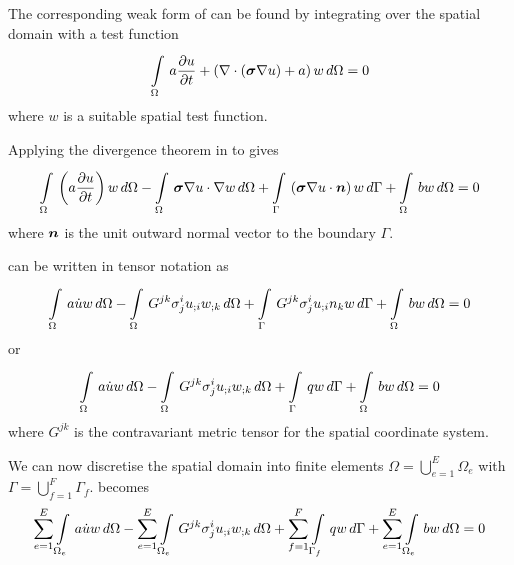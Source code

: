 
The corresponding weak form of  can be found by
integrating over the spatial domain with a test function \ie
\begin{equation}
    \displaystyle\int\limits_{\Omega}^{} \,a \dfrac{\partial u}{\partial t} +\left(  \nabla\cdot\left( \boldsymbol{\sigma}
          \nabla u \right) +a \right)w\,d\Omega =0
  \label{eqn:diffusionweakform1}
\end{equation}
where $w$ is a suitable spatial test function.

Applying the divergence theorem in 
to  gives
\begin{equation}
  \gint{\Omega}{}{\pbrac{a\delby{u}{t}}w}{\Omega}-
      \gint{\Omega}{}{\dotprod{\tensor{\sigma}\gradient{u}}{\gradient{w}}}{\Omega}
      +\gint{\Gamma}{}{\pbrac{\dotprod{\tensor{\sigma}\gradient{u}}{\normal}}w}{\Gamma}+
      \gint{\Omega}{}{bw}{\Omega}=0
  \label{eqn:diffusionweakform2}
\end{equation}
where $\normal$ is the unit outward normal vector to the boundary $\Gamma$.


 can be written in tensor notation as
\begin{equation}
    \displaystyle\int\limits_{\Omega}^{} \,a\dot{u}w\,d\Omega -
    \displaystyle\int\limits_{\Omega}^{} \,G^{jk}\sigma^{i}_{j} {u}_{;i}  {w}_{;k} \,d\Omega +
    \displaystyle\int\limits_{\Gamma}^{} \,G^{jk}\sigma^{i}_{j} {u}_{;i} n_{k}w\,d\Gamma  +
    \displaystyle\int\limits_{\Omega}^{} \,bw\,d\Omega =0
  \label{eqn:diffusiontensorform1}
\end{equation}
or
\begin{equation}
    \displaystyle\int\limits_{\Omega}^{} \,a\dot{u}w\,d\Omega -
    \displaystyle\int\limits_{\Omega}^{} \,G^{jk}\sigma^{i}_{j} {u}_{;i}  {w}_{;k} \,d\Omega +
    \displaystyle\int\limits_{\Gamma}^{} \,qw\,d\Gamma  +
    \displaystyle\int\limits_{\Omega}^{} \,bw\,d\Omega =0
  \label{eqn:diffusiontensorform2}
\end{equation}
where $G^{jk}$ is the contravariant metric tensor for the spatial coordinate system.


We can now discretise the spatial domain into finite elements \ie $\Omega=
\displaystyle{\bigcup_{e=1}^{E}}\Omega_{e}$ with
$\Gamma=\displaystyle{\bigcup_{f=1}^{F}}\Gamma_{f}$. 
 becomes
\begin{equation}
  \displaystyle\sum_{e=1}^{E}  \displaystyle\int\limits_{\Omega_{e}}^{} \,a\dot{u}w\,d\Omega -
  \displaystyle\sum_{e=1}^{E}  \displaystyle\int\limits_{\Omega_{e}}^{} \,G^{jk}\sigma^{i}_{j}
     {u}_{;i}  {w}_{;k} \,d\Omega +
  \displaystyle\sum_{f=1}^{F}  \displaystyle\int\limits_{\Gamma_{f}}^{} \,qw\,d\Gamma  +
  \displaystyle\sum_{e=1}^{E}  \displaystyle\int\limits_{\Omega_{e}}^{} \,bw\,d\Omega =0
  \label{eqn:diffusionfemform}
\end{equation}

